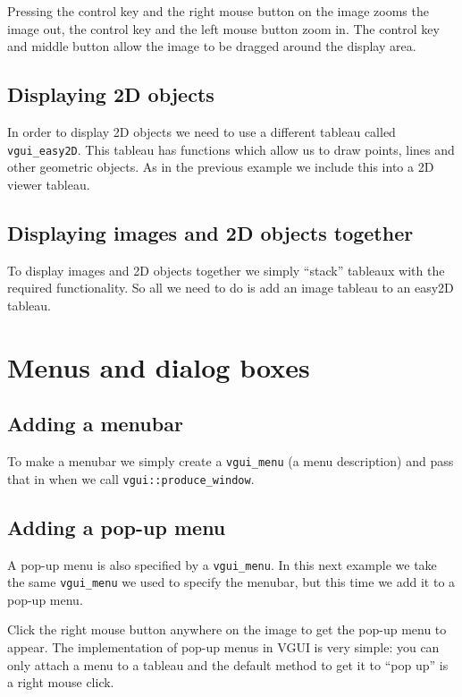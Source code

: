 \documentclass[12pt]{report}
\newcommand{\FSMinput}[1]{}
\begin{document}
Pressing the control key and the right mouse button on the image zooms the
image out, the control key and the left mouse button zoom in.  The control key
and middle button allow the image to be dragged around the display area.
\FSMinput{display-image}

\section{Displaying 2D objects}
In order to display 2D objects we need to use a different tableau called {\tt vgui\_easy2D}.
This tableau has functions which allow us to draw points, lines and other geometric
objects.  As in the previous example we include this into a 2D viewer tableau.
\FSMinput{draw-line}

\section{Displaying images and 2D objects together}
To display images and 2D objects together we simply ``stack'' tableaux with the
required functionality.  So all we need to do is add an image tableau to an easy2D tableau.
\FSMinput{2d-example}

\chapter{Menus and dialog boxes}

\section{Adding a menubar}

To make a menubar we simply create a {\tt vgui\_menu} (a menu description) and pass that in when we call
{\tt vgui::produce\_window}.

\FSMinput{menubar-example}

\section{Adding a pop-up menu}

A pop-up menu is also specified by a {\tt vgui\_menu}.  In this next example we take the
same {\tt vgui\_menu} we used to specify the menubar, but this time we add it to a
pop-up menu.

\FSMinput{popup-example}

Click the right mouse button anywhere on the image to get the pop-up menu to appear.
The implementation of pop-up menus in VGUI is very simple: you can only attach a menu
to a tableau and the default method to get it to ``pop up'' is a right mouse click.
\end{document}
